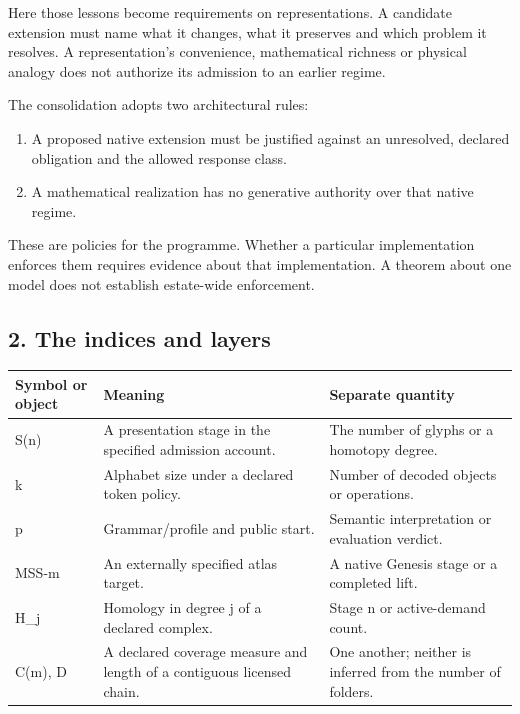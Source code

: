 \documentclass[
  11pt,
]{article}
\providecommand{\tightlist}{%
  \setlength{\itemsep}{0pt}\setlength{\parskip}{0pt}}
\begin{document}
Here those lessons become requirements on representations. A candidate
extension must name what it changes, what it preserves and which problem
it resolves. A representation's convenience, mathematical richness or
physical analogy does not authorize its admission to an earlier regime.

The consolidation adopts two architectural rules:

\begin{enumerate}
\def\labelenumi{\arabic{enumi}.}
\tightlist
\item
  A proposed native extension must be justified against an unresolved,
  declared obligation and the allowed response class.
\item
  A mathematical realization has no generative authority over that
  native regime.
\end{enumerate}

These are policies for the programme. Whether a particular
implementation enforces them requires evidence about that
implementation. A theorem about one model does not establish estate-wide
enforcement.

\subsection{2. The indices and layers}\label{the-indices-and-layers}

\begin{longtable}[]{@{}
  >{\raggedright\arraybackslash}p{}
  >{\raggedright\arraybackslash}p{}
  >{\raggedright\arraybackslash}p{}@{}}
\toprule\noalign{}
\begin{minipage}[b]{\linewidth}\raggedright
Symbol or object
\end{minipage} & \begin{minipage}[b]{\linewidth}\raggedright
Meaning
\end{minipage} & \begin{minipage}[b]{\linewidth}\raggedright
Separate quantity
\end{minipage} \\
\midrule\noalign{}
\endhead
\bottomrule\noalign{}
\endlastfoot
S(n) & A presentation stage in the specified admission account. & The
number of glyphs or a homotopy degree. \\
k & Alphabet size under a declared token policy. & Number of decoded
objects or operations. \\
p & Grammar/profile and public start. & Semantic interpretation or
evaluation verdict. \\
MSS-m & An externally specified atlas target. & A native Genesis stage
or a completed lift. \\
H\_j & Homology in degree j of a declared complex. & Stage n or
active-demand count. \\
C(m), D & A declared coverage measure and length of a contiguous
licensed chain. & One another; neither is inferred from the number of
folders. \\
\end{longtable}
\end{document}
